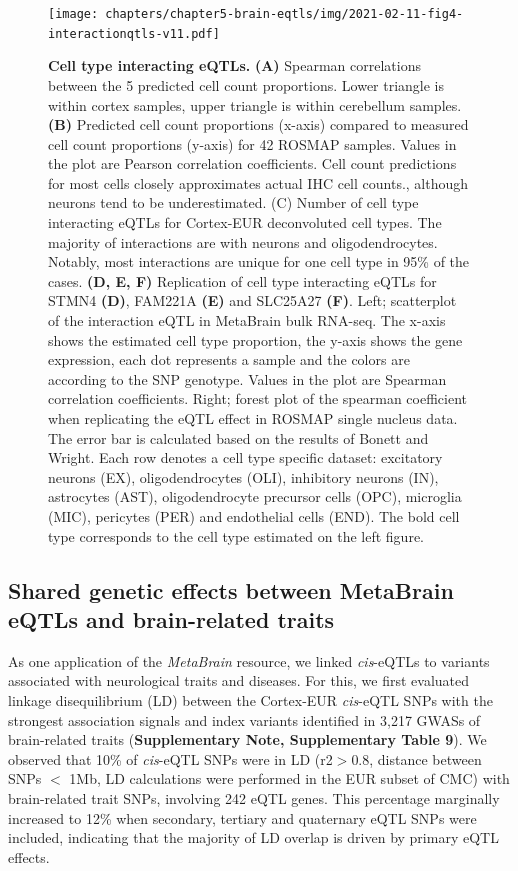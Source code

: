 \begin{figure}[H]
	\texttt{[image: chapters/chapter5-brain-eqtls/img/2021-02-11-fig4-interactionqtls-v11.pdf]}
	\caption{\textbf{Cell type interacting eQTLs.} \textbf{(A)} Spearman correlations between the 5 predicted cell count proportions. Lower triangle is within cortex samples, upper triangle is within cerebellum samples. \textbf{(B)} Predicted cell count proportions (x-axis) compared to measured cell count proportions (y-axis) for 42 ROSMAP samples. Values in the plot are Pearson correlation coefficients. Cell count predictions for most cells closely approximates actual IHC cell counts., although neurons tend to be underestimated. (C) Number of cell type interacting eQTLs for Cortex-EUR deconvoluted cell types. The majority of interactions are with neurons and oligodendrocytes. Notably, most interactions are unique for one cell type in 95\% of the cases. \textbf{(D, E, F)} Replication of cell type interacting eQTLs for STMN4 \textbf{(D)}, FAM221A \textbf{(E)} and SLC25A27 \textbf{(F)}. Left; scatterplot of the interaction eQTL in MetaBrain bulk RNA-seq. The x-axis shows the estimated cell type proportion, the y-axis shows the gene expression, each dot represents a sample and the colors are according to the SNP genotype. Values in the plot are Spearman correlation coefficients. Right; forest plot of the spearman coefficient when replicating the eQTL effect in ROSMAP single nucleus data. The error bar is calculated based on the results of Bonett and Wright\cite{bonettSampleSizeRequirements2000}. Each row denotes a cell type specific dataset: excitatory neurons (EX), oligodendrocytes (OLI), inhibitory neurons (IN), astrocytes (AST), oligodendrocyte precursor cells (OPC), microglia (MIC), pericytes (PER) and endothelial cells (END). The bold cell type corresponds to the cell type estimated on the left figure. }
	\label{metabrain_fig4}
\end{figure}

\subsection{Shared genetic effects between MetaBrain eQTLs and brain-related traits}

As one application of the \emph{MetaBrain} resource, we linked \emph{cis}-eQTLs to variants associated with neurological traits and diseases. For this, we first evaluated linkage disequilibrium (LD) between the Cortex-EUR \emph{cis}-eQTL SNPs with the strongest association signals and index variants identified in 3,217 GWASs of brain-related traits (\textbf{Supplementary Note, Supplementary Table 9}). We observed that 10\% of \emph{cis}-eQTL SNPs were in LD (r2$>$0.8, distance between SNPs $<$ 1Mb, LD calculations were performed in the EUR subset of CMC) with brain-related trait SNPs, involving 242 eQTL genes. This percentage marginally increased to 12\% when secondary, tertiary and quaternary eQTL SNPs were included, indicating that the majority of LD overlap is driven by primary eQTL effects. 

